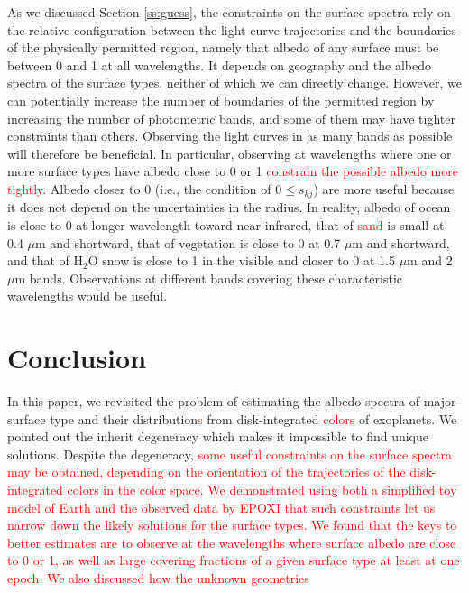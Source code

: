\documentclass[iop,numberedappendix,apj]{emulateapj}
\def\edit#1{\textcolor{red}{#1}}
\begin{document}
As we discussed Section \ref{ss:guess}, the constraints on the surface spectra rely on the relative configuration between the light curve trajectories and the boundaries of the physically permitted region, namely that albedo of any surface must be between 0 and 1 at all wavelengths. 
It depends on geography and the albedo spectra of the surface types, neither of which we can directly change. 
However, we can potentially increase the number of boundaries of the permitted region by increasing the number of photometric bands, and some of them may have tighter constraints than others. 
Observing the light curves in as many bands as possible will therefore be beneficial.  
In particular, observing at wavelengths where one or more surface types have albedo close to 0 or 1 \edit{constrain the possible albedo more tightly}. 
Albedo closer to 0 (i.e., the condition of $0 \le s_{kj}$) are more useful because it does not depend on the uncertainties in the radius. 
In reality, albedo of ocean is close to 0 at longer wavelength toward near infrared, that of \edit{sand} is small at 0.4 $\mu $m and shortward, that of vegetation is close to 0 at 0.7 $\mu$m and shortward, and that of H$_2$O snow is close to 1 in the visible and closer to 0 at 1.5 $\mu$m and 2 $\mu$m bands. 
Observations at different bands covering these characteristic wavelengths would be useful. 





\section{Conclusion}
\label{s:conclusion}

In this paper, we revisited the problem of estimating the albedo spectra of major surface type and their distribution\edit{s} from disk-integrated \edit{colors} of exoplanets. 
We pointed out the inherit degeneracy which makes it impossible to find unique solutions. 
Despite the degeneracy, 
\edit{some useful constraints on the surface spectra may be obtained, depending on the orientation of the trajectories of the disk-integrated colors in the color space.  %
We demonstrated using both a simplified toy model of Earth and the observed data by EPOXI that such constraints let us narrow down the likely solutions for the surface types. %
We found that the keys to better estimates are to observe at the wavelengths where surface albedo are close to 0 or 1, as well as large covering fractions of a given surface type at least at one epoch. %
We also discussed how the unknown geometries }
\end{document}

